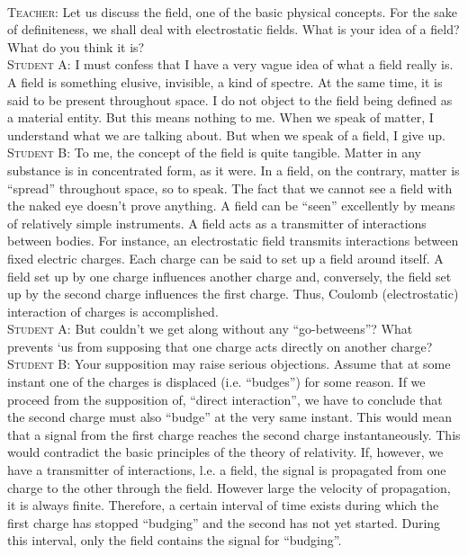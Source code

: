 \documentclass[a4paper,sfsidenotes]{tufte-book}
\begin{document}
\paragraph{}
\textsc{Teacher:} Let us discuss the field, one of the basic physical concepts. For the sake of definiteness, we shall deal with electrostatic fields. What is your idea of a field? What do you think it is?
\\
\textsc{Student A:} I must confess that I have a very vague idea of  what a field really is. A field is something elusive, invisible, a kind of spectre. At the same time, it is said to be present throughout space. I do not object to the field being defined as a material entity. But this means nothing to me. When we speak of matter, I understand what we are talking about. But when we speak of a field, I give up.
\\
\textsc{Student B:} To me, the concept of the field is quite tangible. Matter in any substance is in concentrated form, as it were. In a field, on the contrary, matter is ``spread'' throughout space, so to speak. The fact that we cannot see a field with the naked eye doesn't prove anything. A field can be ``seen'' excellently by means of relatively simple instruments. A field acts as a transmitter of interactions between bodies. For instance, an electrostatic field transmits interactions between fixed electric charges. Each charge can be said to set up a field around itself. A field set up by one charge influences another charge and, conversely, the field set up by the second charge influences the first charge. Thus, Coulomb (electrostatic) interaction of charges is accomplished.
\\
\textsc{Student A:} But couldn't we get along without any ``go-betweens''? What prevents `us from supposing that one charge acts directly on another charge?
\\
\textsc{Student B:} Your supposition may raise serious objections. Assume that at some instant one of the charges is displaced (i.e. ``budges'') for some reason. If we proceed from the supposition of, ``direct interaction'', we have to conclude that the second charge must also ``budge'' at the very same instant. This would mean that a signal from the first charge reaches the second charge instantaneously. This would contradict the basic principles of the theory of relativity. If, however, we have a transmitter of interactions, l.e. a field, the signal is propagated from one charge to the other through the field. However large the velocity of propagation, it is always finite. Therefore, a certain interval of time exists during which the first charge has stopped ``budging'' and the second has not yet started. During this interval, only the field contains the signal for ``budging''.
\end{document}
